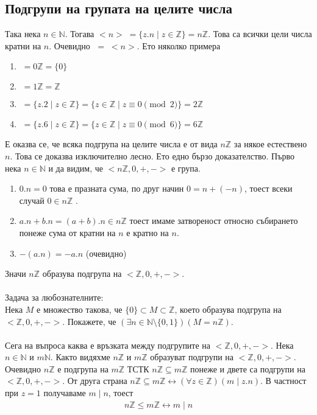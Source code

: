 \documentclass[12pt]{article}
\begin{document}
\subsection{Подгрупи на групата на целите числа}
Така нека \(n \in \mathbb{N}\). Тогава \(<n> \; = \{z.n \; | \; z \in \mathbb{Z}\} = n\mathbb{Z}\). Това са всички цели числа кратни на \(n\).
Очевидно \(<-n> \; = \; <n>\).
Ето няколко примера
\begin{enumerate}
    \item \(<0> \; = 0\mathbb{Z} = \{0\}\)
    \item \(<1> \; = 1\mathbb{Z} = \mathbb{Z}\)
    \item \(<2> \; = \{z.2 \; | \; z \in \mathbb{Z}\} = \{z \in \mathbb{Z} \; | \; z \equiv 0 \pmod{2}\} = 2\mathbb{Z}\)
    \item \(<6> \; = \{z.6 \; | \; z \in \mathbb{Z}\} = \{z \in \mathbb{Z} \; | \; z \equiv 0 \pmod{6}\} = 6\mathbb{Z}\)
\end{enumerate}
Е оказва се, че всяка подгрупа на целите числа е от вида \(n\mathbb{Z}\) за някое естествено \(n\). Това се доказва изключително лесно. Ето едно бързо доказателство.
Първо нека \(n \in \mathbb{N}\) и да видим, че \(<n\mathbb{Z}, 0, +, ->\) е група.
\begin{enumerate}
    \item \(0.n = 0\) това е празната сума, по друг начин \(0 = n + (-n)\), тоест всеки случай \(0 \in n\mathbb{Z}\) .
    \item \(a.n + b.n = (a + b).n \in n\mathbb{Z}\) тоест имаме затвореност относно събирането понеже сума от кратни на \(n\) е кратно на \(n\).
    \item \(-(a.n) = -a.n\) (очевидно)
\end{enumerate}
Значи \(n\mathbb{Z}\) образува подгрупа на \(<\mathbb{Z}, 0, +, ->\).
\\
\vspace{2mm}
\\
Задача за любознателните:  \\
Нека \(M\) е множество такова, че \(\{0\} \subset M \subset \mathbb{Z}\),
което образува подгрупа на \(<\mathbb{Z}, 0, +, ->\). Покажете, че
\((\exists n \in \mathbb{N} \setminus \{0, 1\})(M = n\mathbb{Z})\).
\\
\vspace{2mm}
\\
Сега на въпроса каква е връзката между подгрупите на \(<\mathbb{Z}, 0, +, ->\).
Нека \(n \in \mathbb{N}\) и \(m \mathbb{N}\). Както видяхме \(n\mathbb{Z}\) и \(m\mathbb{Z}\) образуват подгрупи на \(<\mathbb{Z}, 0, +, ->\).
Очевидно \(n\mathbb{Z}\) е подгрупа на \(m\mathbb{Z}\) ТСТК \(n\mathbb{Z} \subseteq m\mathbb{Z}\) понеже и двете са подгрупи на \(<\mathbb{Z}, 0, +, ->\).
От друга страна \(n\mathbb{Z} \subseteq m\mathbb{Z} \longleftrightarrow (\forall z \in \mathbb{Z})(m \mid z.n)\). В частност при \(z = 1\) получаваме \(m \mid n\), тоест
\begin{align*}
    n\mathbb{Z} \leq m\mathbb{Z} \longleftrightarrow m \mid n
\end{align*}
\end{document}
